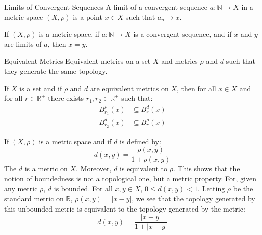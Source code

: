 \documentclass[crop=false,class=book,oneside]{standalone}
\begin{document}
            \begin{ldefinition}{Limits of Convergent Sequences}
                A limit of a convergent sequence
                $a:\mathbb{N}\rightarrow{X}$ in a metric space
                $(X,\rho)$ is a point $x\in{X}$ such that
                $a_{n}\rightarrow{x}$.
            \end{ldefinition}
            \begin{theorem}
                If $(X,\rho)$ is a metric space, if
                $a:\mathbb{N}\rightarrow{X}$ is a convergent
                sequence, and if $x$ and $y$ are limits of $a$,
                then $x=y$.
            \end{theorem}
            \begin{ldefinition}{Equivalent Metrics}
                Equivalent metrics on a set $X$ and metrics
                $\rho$ and $d$ such that they generate the
                same topology.
            \end{ldefinition}
            \begin{theorem}
                If $X$ is a set and if $\rho$ and $d$ are
                equivalent metrics on $X$, then for all $x\in{X}$
                and for all $r\in\mathbb{R}^{+}$ there exists
                $r_{1},r_{2}\in\mathbb{R}^{+}$ such that:
                \begin{align}
                    B_{r_{1}}^{\rho}(x)&\subseteq{B}_{r}^{d}(x)\\
                    B_{r_{2}}^{d}(x)&\subseteq{B}_{r}^{\rho}(x)
                \end{align}
            \end{theorem}
            \begin{lexample}
                If $(X,\rho)$ is a metric space and if $d$
                is defined by:
                \begin{equation}
                    d(x,y)=\frac{\rho(x,y)}{1+\rho(x,y)}
                \end{equation}
                The $d$ is a metric on $X$. Moreover, $d$
                is equivalent to $\rho$. This shows that the
                notion of boundedness is not a topological one,
                but a metric property. For, given any metric
                $\rho$, $d$ is bounded. For all $x,y\in{X}$,
                $0\leq{d}(x,y)<1$. Letting $\rho$ be the
                standard metric on $\mathbb{R}$,
                $\rho(x,y)=|x-y|$, we see that the topology
                generated by this unbounded metric is equivalent
                to the topology generated by the metric:
                \begin{equation}
                    d(x,y)=\frac{|x-y|}{1+|x-y|}
                \end{equation}
            \end{lexample}
\end{document}
